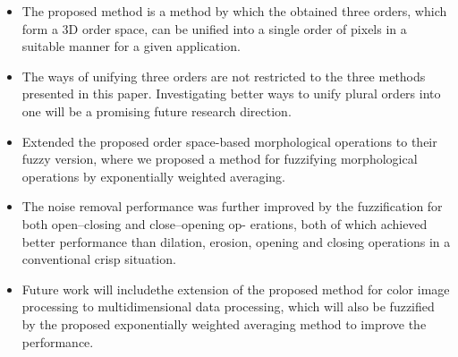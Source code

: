 \begin{itemize}
    \item The proposed method is a method by which the obtained three orders, which form a 3D order space, can be unified into a single order of pixels in a suitable manner for a given application.
    \item The ways of unifying three orders are not restricted to the three methods presented in this paper. Investigating better ways to unify plural orders into one will be a promising future research direction.
    \item Extended the proposed order space-based morphological operations to their fuzzy version, where we proposed a method for fuzzifying morphological operations by exponentially weighted averaging.
    \item The noise removal performance was further improved by the fuzzification for both open–closing and close–opening op- erations, both of which achieved better performance than dilation, erosion, opening and closing operations in a conventional crisp situation.
    \item Future work will includethe extension of the proposed method for color image processing to multidimensional data processing, which will also be fuzzified by the proposed exponentially weighted averaging method to improve the performance.
\end{itemize}